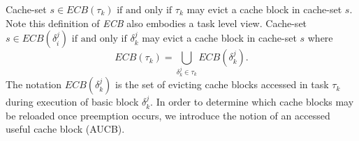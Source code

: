 \noindent Cache-set \begin{math}s \in \textit{ECB}(\tau_{k})\textrm{ if and only if }\tau_{k}\end{math} may evict a cache block in cache-set $s$.  Note this definition of \textit{ECB} also embodies a task level view.  Cache-set \begin{math}s \in \textit{ECB}(\delta_{i}^{j})\textrm{ if and only if } \delta_{k}^{j}\end{math} may evict a cache block in cache-set $s$ where
\begin{equation}\label{eqn:ecb-task}
    \textit{ECB}(\tau_{k}) = \bigcup_{\delta_{k}^{j} \in \tau_{k}} \textit{ECB}(\delta_{k}^{j}).
\end{equation}
\noindent The notation \begin{math}\textit{ECB}(\delta_{k}^{j})\end{math} is the set of evicting cache blocks accessed in task \begin{math}\tau_{k}\end{math} during execution of basic block \begin{math}\delta_{k}^{j}\end{math}.  In order to determine which cache blocks may be reloaded once preemption occurs, we introduce the notion of an accessed useful cache block (AUCB).
%
%
%
